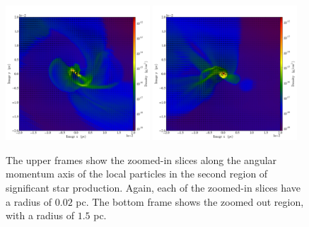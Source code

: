 \documentclass{emulateapj}
\begin{document}
\begin{figure}
\includegraphics[width=0.48\textwidth]{movie_disk_0132_0002.png}
\includegraphics[width=0.48\textwidth]{movie_disk_0132_0004.png}
\caption{The upper frames show the zoomed-in slices along the angular momentum axis of the local particles in the second region of significant star production.  Again, each of the zoomed-in slices have a radius of $0.02$ pc.  The bottom frame shows the zoomed out region, with a radius of $1.5$ pc.  \label{fig:snapshots 2}}
\end{figure}
\end{document}
